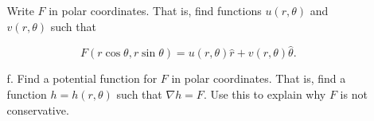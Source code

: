 \documentclass[11 pt]{report}
\begin{document}
\begin{enumerate}
\begin{enumerate}
Write $F$ in polar coordinates. That is, find functions $u(r,\theta)$ and $v(r, \theta)$ such that

\[
F(r \cos \theta, r \sin \theta) = u(r,\theta) \hat{r} + v(r,\theta) \hat{\theta}.
\]

\item[f.] Find a potential function for $F$ in polar coordinates. That is, find a function $h = h(r, \theta)$ such that $\nabla h = F$. Use this to explain why $F$ is not conservative. 

\end{enumerate}

%
%


\end{enumerate} 
\end{document}
